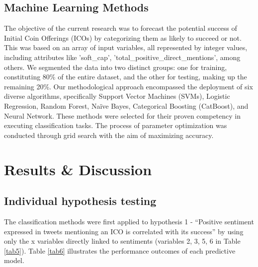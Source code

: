 \documentclass[runningheads]{llncs}
\begin{document}
\subsection{Machine Learning Methods}

The objective of the current research was to forecast the potential success of Initial Coin Offerings (ICOs) by categorizing them as likely to succeed or not. This was based on an array of input variables, all represented by integer values, including attributes like 'soft\_cap', 'total\_positive\_direct\_mentions', among others. We segmented the data into two distinct groups: one for training, constituting 80\% of the entire dataset, and the other for testing, making up the remaining 20\%. Our methodological approach encompassed the deployment of six diverse algorithms, specifically Support Vector Machines (SVMs), Logistic Regression, Random Forest, Naïve Bayes, Categorical Boosting (CatBoost), and Neural Network. These methods were selected for their proven competency in executing classification tasks. The process of parameter optimization was conducted through grid search with the aim of maximizing accuracy.




\section{Results \& Discussion}

\subsection{Individual hypothesis testing}
The classification methods were first applied to hypothesis 1 - ``Positive sentiment expressed in tweets mentioning an ICO is correlated with its success'' by using only the x variables directly linked to sentiments (variables 2, 3, 5, 6 in Table \ref{tab5}). Table \ref{tab6} illustrates the performance outcomes of each predictive model. 

\end{document}
